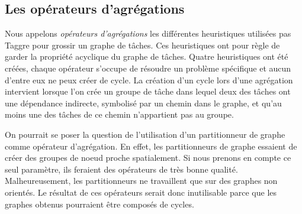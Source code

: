 \subsection{Les opérateurs d'agrégations}
Nous appelons {\em opérateurs d'agrégations} les différentes heuristiques utilisées pas Taggre pour grossir un graphe de tâches.
%
Ces heuristiques ont pour règle de garder la propriété acyclique du graphe de tâches.
%
Quatre heuristiques ont été créées, chaque opérateur s'occupe de résoudre un problème spécifique et aucun d'entre eux ne peux créer de cycle.
%
La création d'un cycle lors d'une agrégation intervient lorsque l'on crée un groupe de tâche dans lequel deux des tâches ont une dépendance indirecte, symbolisé par un chemin dans le graphe, et qu'au moins une des tâches de ce chemin n'appartient pas au groupe.



On pourrait se poser la question de l'utilisation d'un partitionneur de graphe comme opérateur d'agrégation.
%
En effet, les partitionneurs de graphe essaient de créer des groupes de noeud proche spatialement.
%
Si nous prenons en compte ce seul paramètre, ils feraient des opérateurs de très bonne qualité.
%
Malheureusement, les partitionneurs ne travaillent que sur des graphes non orientés.
%
Le résultat de ces opérateurs serait donc inutilisable parce que les graphes obtenus pourraient être composés de cycles.
